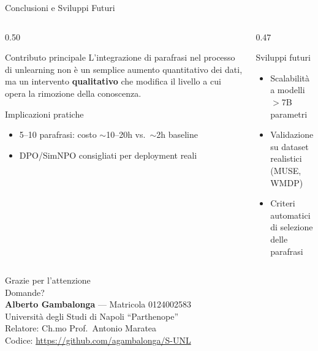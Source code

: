 \documentclass[aspectratio=169,11pt]{beamer}
\begin{document}
\begin{frame}{Conclusioni e Sviluppi Futuri}
  \begin{columns}[T]
    \begin{column}{0.50\textwidth}
      \begin{block}{Contributo principale}
        L'integrazione di parafrasi nel processo di unlearning non è un semplice aumento quantitativo dei dati, ma un intervento \textbf{qualitativo} che modifica il livello a cui opera la rimozione della conoscenza.
      \end{block}
      \vspace{0.3em}
      \begin{exampleblock}{Implicazioni pratiche}
        \begin{itemize}
          \item 5--10 parafrasi: costo $\sim$10--20h vs.\ $\sim$2h baseline
          \item DPO/SimNPO consigliati per deployment reali
        \end{itemize}
      \end{exampleblock}
    \end{column}
    \begin{column}{0.47\textwidth}
      \begin{alertblock}{Sviluppi futuri}
        \begin{itemize}
          \item Scalabilità a modelli $>$7B parametri
          \item Validazione su dataset realistici (MUSE, WMDP)
          \item Criteri automatici di selezione delle parafrasi
        \end{itemize}
      \end{alertblock}
    \end{column}
  \end{columns}
\end{frame}

\begin{frame}[plain]
  \begin{center}
    \vspace{2cm}
    {\Huge\color{uniblue} Grazie per l'attenzione}\\[1.5em]
    {\Large Domande?}\\[2em]
    {\normalsize
      \textbf{Alberto Gambalonga} — Matricola 0124002583\\[0.3em]
      Universit\`a degli Studi di Napoli ``Parthenope''\\[0.3em]
      Relatore: Ch.mo Prof.\ Antonio Maratea\\[0.5em]
      Codice: \url{https://github.com/agambalonga/S-UNL}
    }
  \end{center}
\end{frame}
\end{document}
